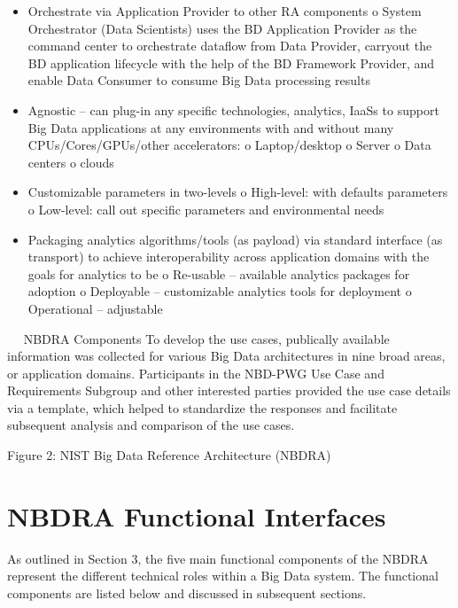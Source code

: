 \documentclass[11pt]{article}
\begin{document}
\begin{itemize}
\item	Orchestrate via Application Provider to other RA components
o	System Orchestrator (Data Scientists) uses the BD Application Provider as the command 
center to orchestrate dataflow from Data Provider, carryout the BD application lifecycle 
with the help of the BD Framework Provider, and enable Data Consumer to consume Big 
Data processing results 
\item	Agnostic – can plug-in any specific technologies, analytics, IaaSs to support Big Data 
applications at any environments with and without many CPUs/Cores/GPUs/other accelerators:
o	Laptop/desktop
o	Server
o	Data centers
o	clouds
\item	Customizable parameters in two-levels
o	High-level: with defaults parameters
o	Low-level: call out specific parameters and environmental needs
\item	Packaging analytics algorithms/tools (as payload) via standard interface (as transport) to achieve 
interoperability across application domains with the goals for analytics to be
o	Re-usable – available analytics packages for adoption
o	Deployable – customizable analytics tools for deployment
o	Operational – adjustable 
\end{itemize}

 
NBDRA Components
To develop the use cases, publically available information was collected for various Big Data 
architectures in nine broad areas, or application domains. Participants in the NBD-PWG Use Case and 
Requirements Subgroup and other interested parties provided the use case details via a template, which 
helped to standardize the responses and facilitate subsequent analysis and comparison of the use cases. 

Figure 2: NIST Big Data Reference Architecture (NBDRA)

\section{NBDRA Functional Interfaces}

As outlined in Section 3, the five main functional components of the NBDRA represent the different 
technical roles within a Big Data system. The functional components are listed below and discussed in 
subsequent sections.
\end{document}

